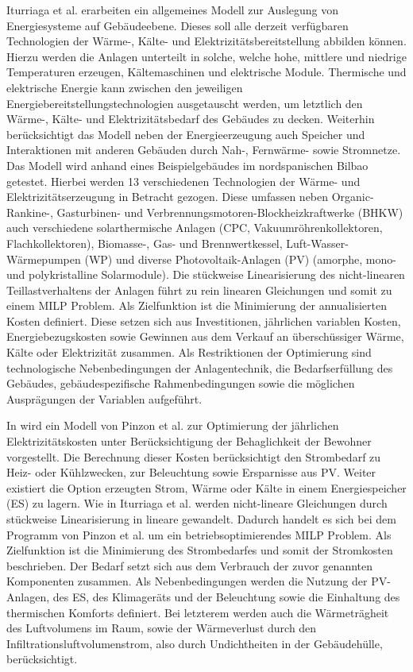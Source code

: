 Iturriaga et al. \cite{Iturriaga.2017} erarbeiten ein allgemeines Modell zur Auslegung von Energiesysteme auf Gebäudeebene. 
Dieses soll alle derzeit verfügbaren Technologien der Wärme-, Kälte- und Elektrizitätsbereitstellung abbilden können.
Hierzu werden die Anlagen unterteilt in solche, welche hohe, mittlere und niedrige Temperaturen erzeugen, Kältemaschinen und elektrische Module.
Thermische und elektrische Energie kann zwischen den jeweiligen Energiebereitstellungstechnologien ausgetauscht werden, um letztlich den Wärme-, Kälte- und Elektrizitätsbedarf des Gebäudes zu decken.
Weiterhin berücksichtigt das Modell neben der Energieerzeugung auch Speicher und Interaktionen mit anderen Gebäuden durch Nah-, Fernwärme- sowie Stromnetze.
Das Modell wird anhand eines Beispielgebäudes im nordspanischen Bilbao getestet.
Hierbei werden 13 verschiedenen Technologien der Wärme- und Elektrizitätserzeugung in Betracht gezogen.
Diese umfassen neben Organic-Rankine-, Gasturbinen- und Verbrennungsmotoren-Blockheizkraftwerke (BHKW) auch verschiedene solarthermische Anlagen (CPC, Vakuumröhrenkollektoren, Flachkollektoren), Biomasse-, Gas- und Brennwertkessel, Luft-Wasser-Wärmepumpen (WP) und diverse Photovoltaik-Anlagen (PV) (amorphe, mono- und polykristalline Solarmodule).
Die stückweise Linearisierung des nicht-linearen Teillastverhaltens der Anlagen führt zu rein linearen Gleichungen und somit zu einem MILP Problem.
Als Zielfunktion ist die Minimierung der annualisierten Kosten definiert. 
Diese setzen sich aus Investitionen, jährlichen variablen Kosten, Energiebezugskosten sowie Gewinnen aus dem Verkauf an überschüssiger Wärme, Kälte oder Elektrizität zusammen.
Als Restriktionen der Optimierung sind technologische Nebenbedingungen der Anlagentechnik, die Bedarfserfüllung des Gebäudes, gebäudespezifische Rahmenbedingungen sowie die möglichen Ausprägungen der Variablen aufgeführt.

In \cite{Pinzon.23.04.201726.04.2017} wird ein Modell von Pinzon et al. zur Optimierung der jährlichen Elektrizitätskosten unter Berücksichtigung der Behaglichkeit der Bewohner vorgestellt.
Die Berechnung dieser Kosten berücksichtigt den Strombedarf zu Heiz- oder Kühlzwecken, zur Beleuchtung sowie Ersparnisse aus PV.
Weiter existiert die Option erzeugten Strom, Wärme oder Kälte in einem Energiespeicher (ES) zu lagern.
Wie in Iturriaga et al. \cite{Iturriaga.2017} werden nicht-lineare Gleichungen durch stückweise Linearisierung in lineare gewandelt.
Dadurch handelt es sich bei dem Programm von Pinzon et al. um ein betriebsoptimierendes MILP Problem.
Als Zielfunktion ist die Minimierung des Strombedarfes und somit der Stromkosten beschrieben.
Der Bedarf setzt sich aus dem Verbrauch der zuvor genannten Komponenten zusammen.
Als Nebenbedingungen werden die Nutzung der PV-Anlagen, des ES, des Klimageräts und der Beleuchtung sowie die Einhaltung des thermischen Komforts definiert.
Bei letzterem werden auch die Wärmeträgheit des Luftvolumens im Raum, sowie der Wärmeverlust durch den Infiltrationsluftvolumenstrom, also durch Undichtheiten in der Gebäudehülle, berücksichtigt.

